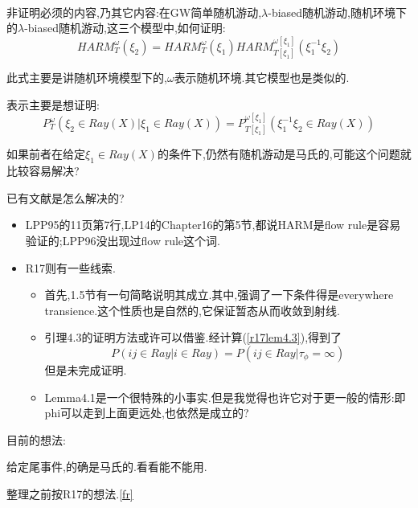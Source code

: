 \documentclass[a4paper,oneside]{ctexbook}
\begin{document}
					\begin{que}
						\label{origin flow rule}
						\ 

						非证明必须的内容,乃其它内容:在GW简单随机游动,$\lambda$-biased随机游动,随机环境下的$\lambda$-biased随机游动,这三个模型中,如何证明:
						$$HARM^\omega_T(\xi_2) = HARM^\omega_T(\xi_1)HARM^{\omega[\xi_1]}_{T[\xi_1]}(\xi_1^{-1}\xi_2)$$

						此式主要是讲随机环境模型下的,$\omega$表示随机环境.其它模型也是类似的.

						表示主要是想证明:
						$$P^\omega_T( \xi_2 \in Ray(X) | \xi_1 \in Ray(X) ) = P^{\omega[\xi_1]}_{T[\xi_1]}( \xi_1^{-1}\xi_2 \in Ray(X) )$$

						如果前者在给定${\xi_1 \in Ray(X)}$的条件下,仍然有随机游动是马氏的,可能这个问题就比较容易解决?

						\qquad 已有文献是怎么解决的?


						\begin{itemize}
							
							\item LPP95的11页第7行,LP14的Chapter16的第5节,都说HARM是flow rule是容易验证的;LPP96没出现过flow rule这个词.

							\item R17则有一些线索.

								\begin{itemize}
							
									\item 首先,1.5节有一句简略说明其成立.其中,强调了一下条件得是everywhere transience.这个性质也是自然的,它保证暂态从而收敛到射线.

									\item 引理4.3的证明方法或许可以借鉴.经计算(\ref{r17lem4.3}),得到了
									$$P(ij\in Ray | i \in Ray) = P(ij\in Ray | \tau_\phi = \infty)$$
									但是未完成证明.

									\item Lemma4.1是一个很特殊的小事实.但是我觉得也许它对于更一般的情形:即phi可以走到上面更远处,也依然是成立的?

								\end{itemize}

						\end{itemize}
							

						\qquad 目前的想法:

							给定尾事件,的确是马氏的.看看能不能用.

							整理之前按R17的想法.\ref{fr}


\end{que}
\end{document}
